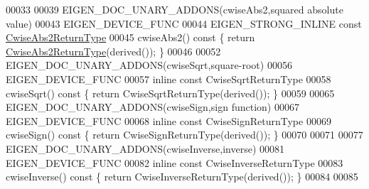 \begin{DoxyCode}
00033 
00039 EIGEN\_DOC\_UNARY\_ADDONS(cwiseAbs2,squared absolute value)
00043 EIGEN\_DEVICE\_FUNC
00044 EIGEN\_STRONG\_INLINE \textcolor{keyword}{const} \hyperlink{group___core___module_class_eigen_1_1_cwise_unary_op}{CwiseAbs2ReturnType}
00045 cwiseAbs2()\textcolor{keyword}{ const }\{ \textcolor{keywordflow}{return} \hyperlink{group___core___module_class_eigen_1_1_cwise_unary_op}{CwiseAbs2ReturnType}(derived()); \}
00046 
00052 EIGEN\_DOC\_UNARY\_ADDONS(cwiseSqrt,square-root)
00056 EIGEN\_DEVICE\_FUNC
00057 \textcolor{keyword}{inline} \textcolor{keyword}{const} CwiseSqrtReturnType
00058 cwiseSqrt()\textcolor{keyword}{ const }\{ \textcolor{keywordflow}{return} CwiseSqrtReturnType(derived()); \}
00059 
00065 EIGEN\_DOC\_UNARY\_ADDONS(cwiseSign,sign \textcolor{keyword}{function})
00067 EIGEN\_DEVICE\_FUNC
00068 \textcolor{keyword}{inline} \textcolor{keyword}{const} CwiseSignReturnType
00069 cwiseSign()\textcolor{keyword}{ const }\{ \textcolor{keywordflow}{return} CwiseSignReturnType(derived()); \}
00070 
00071 
00077 EIGEN\_DOC\_UNARY\_ADDONS(cwiseInverse,inverse)
00081 EIGEN\_DEVICE\_FUNC
00082 \textcolor{keyword}{inline} \textcolor{keyword}{const} CwiseInverseReturnType
00083 cwiseInverse()\textcolor{keyword}{ const }\{ \textcolor{keywordflow}{return} CwiseInverseReturnType(derived()); \}
00084 
00085 
\end{DoxyCode}
